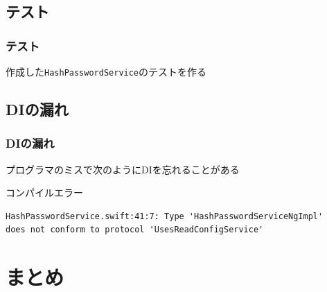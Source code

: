 \subsection{テスト}

\begin{frame}
  \frametitle{テスト}

  作成した\texttt{HashPasswordService}のテストを作る
   {
    
  }
  
  \begin{center}
  \end{center}
\end{frame}

\subsection{DIの漏れ}

\begin{frame}[fragile]
  \frametitle{DIの漏れ}

  \pause

  プログラマのミスで次のようにDIを忘れることがある
  

  \pause

  \begin{alertblock}{コンパイルエラー}
\begin{lstlisting}[basicstyle=\listingfont\scriptsize]
HashPasswordService.swift:41:7: Type 'HashPasswordServiceNgImpl'
does not conform to protocol 'UsesReadConfigService'
\end{lstlisting}
  \end{alertblock}

  \pause

  \begin{center}
  \end{center}
\end{frame}

\section{まとめ}

